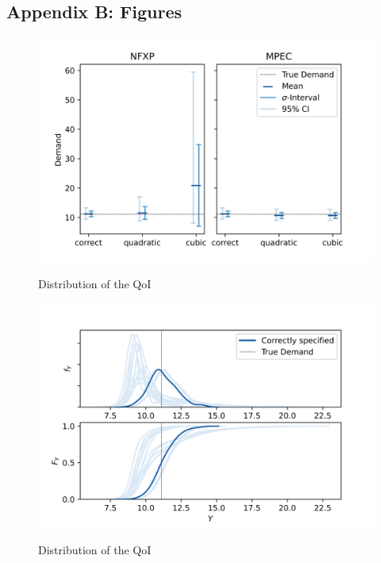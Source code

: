 \subsection{Appendix B: Figures}


\begin{figure}[H]
	\caption{Distribution of the QoI}
	\vspace*{-4mm}
	\centering
	\includegraphics[scale=0.9]{../figures/figure_12.png}
	\label{figure12}
\end{figure}

\begin{figure}[H]
	\caption{Distribution of the QoI}
	\vspace*{-4mm}
	\centering
	\includegraphics[scale=0.9]{../figures/figure_13.png}
	\label{figure13}
\end{figure}
